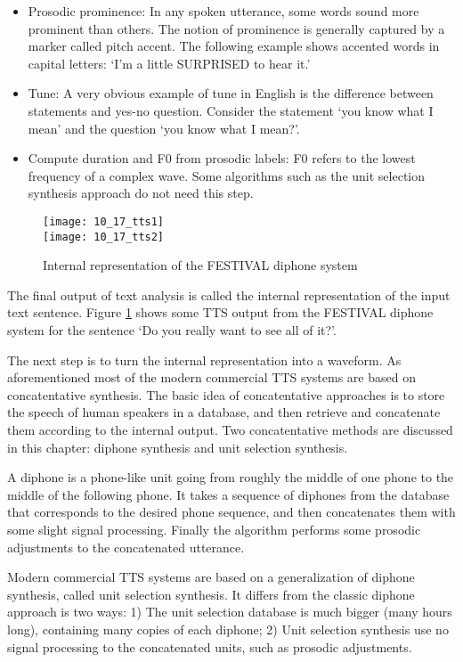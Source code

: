 \begin{enumerate}
{\begin{itemize}
    \item Prosodic prominence: In any spoken utterance, some words sound more prominent than others. The notion of prominence is generally captured by a marker called pitch accent. The following example shows accented words in capital letters: `I'm a little SURPRISED to hear it.'
    \item Tune: A very obvious example of tune in English is the difference between statements and yes-no question. Consider the statement `you know what I mean' and the question `you know what I mean?'.
    \item Compute duration and F0 from prosodic labels: F0 refers to the lowest frequency of a complex wave. Some algorithms such as the unit selection synthesis approach do not need this step.
    \end{itemize}
}
\end{enumerate}

\begin{figure}[htbp]
  \centering
  \texttt{[image: 10\_17\_tts1]}\\
  \texttt{[image: 10\_17\_tts2]}\\
  \caption{Internal representation of the FESTIVAL diphone system}\label{fig:TTS_inter}
\end{figure}

The final output of text analysis is called the internal representation of the input text sentence. Figure \ref{fig:TTS_inter} shows some TTS output from the FESTIVAL diphone system for the sentence `Do you really want to see all of it?'.

The next step is to turn the internal representation into a waveform. As aforementioned most of the modern commercial TTS systems are based on concatentative synthesis. The basic idea of concatentative approaches is to store the speech of human speakers in a database, and then retrieve and concatenate them according to the internal output. Two concatentative methods are discussed in this chapter: diphone synthesis and unit selection synthesis.

A diphone is a phone-like unit going from roughly the middle of one phone to the middle of the following phone. It takes a sequence of diphones from the database that corresponds to the desired phone sequence, and then concatenates them with some slight signal processing. Finally the algorithm performs some prosodic adjustments to the concatenated utterance.

Modern commercial TTS systems are based on a generalization of diphone synthesis, called unit selection synthesis. It differs from the classic diphone approach is two ways: 1) The unit selection database is much bigger (many hours long), containing many copies of each diphone; 2) Unit selection synthesis use no signal processing to the concatenated units, such as prosodic adjustments.

